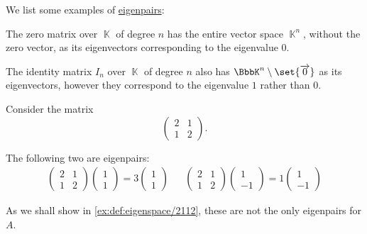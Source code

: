 \begin{example}\label{ex:def:eigenpair}
  We list some examples of \hyperref[def:eigenpair]{eigenpairs}:
  \begin{thmenum}
     The zero matrix over \( \BbbK \) of degree \( n \) has the entire vector space \( \BbbK^n \), without the zero vector, as its eigenvectors corresponding to the eigenvalue \( 0 \).

     The identity matrix \( I_n \) over \( \BbbK \) of degree \( n \) also has \( \BbbK^n \setminus \set{ \vect 0 } \) as its eigenvectors, however they correspond to the eigenvalue \( 1 \) rather than \( 0 \).

     Consider the matrix
    \begin{equation*}
      \begin{pmatrix}
        2 & 1 \\
        1 & 2
      \end{pmatrix}.
    \end{equation*}

    The following two are eigenpairs:
    \begin{align*}
      \begin{pmatrix}
        2 & 1 \\
        1 & 2
      \end{pmatrix}
      \begin{pmatrix}
        1 \\ 1
      \end{pmatrix}
      =
      3
      \begin{pmatrix}
        1 \\ 1
      \end{pmatrix}
      &&
      \begin{pmatrix}
        2 & 1 \\
        1 & 2
      \end{pmatrix}
      \begin{pmatrix}
        1 \\ -1
      \end{pmatrix}
      =
      1
      \begin{pmatrix}
        1 \\ -1
      \end{pmatrix}
    \end{align*}

    As we shall show in \cref{ex:def:eigenspace/2112}, these are not the only eigenpairs for \( A \).


\end{thmenum}
\end{example}
